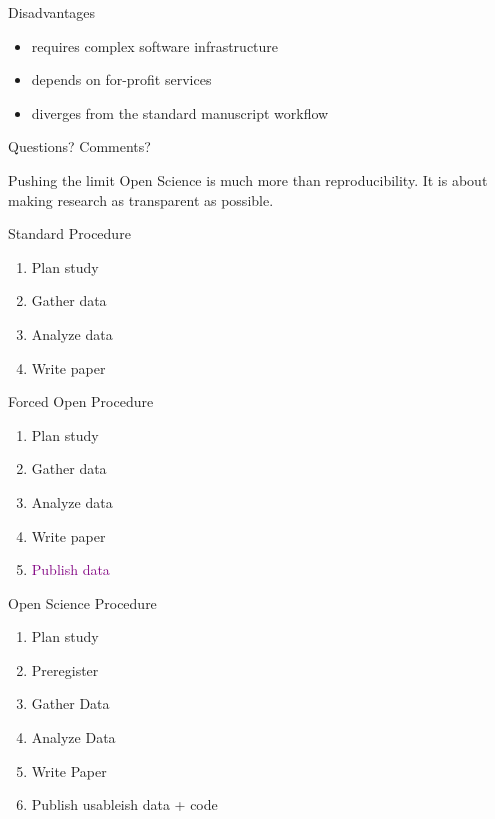 \documentclass[12pt,t]{beamer}
\begin{document}
\begin{frame}[c]{Disadvantages}
\begin{itemize}
	\item requires complex software infrastructure
	\item depends on for-profit services
	\item diverges from the standard manuscript workflow
\end{itemize}
\end{frame}

\begin{frame}[c]
  \begin{center}
    \Huge \textcolor{vhilit}{Questions?}
    \Huge \textcolor{hilit}{Comments?}
  \end{center}
\end{frame}

\begin{frame}[c]{Pushing the limit}
  Open Science is much more than \textcolor{hilit}{reproducibility}.
  It is about making research as \textcolor{vhilit}{transparent} as possible.
\end{frame}

\begin{frame}[c]{Standard Procedure}
  \begin{enumerate}
    \item Plan study
    \item Gather data
    \item Analyze data
    \item Write paper
  \end{enumerate}
\end{frame}

\begin{frame}[c]{Forced Open Procedure}
  \begin{enumerate}
    \item Plan study
    \item Gather data
    \item Analyze data
    \item Write paper
    \item \textcolor{purple}{Publish data}
  \end{enumerate}
\end{frame}

\begin{frame}[c]{Open Science Procedure}
  \begin{enumerate}
    \item Plan study
    \item \textcolor{vhilit}{Preregister}
    \item Gather Data
    \item Analyze Data
    \item Write Paper
    \item Publish \textcolor{hilit}{usableish} data + \textcolor{hilit}{code}
  \end{enumerate}
\end{frame}
\end{document}
